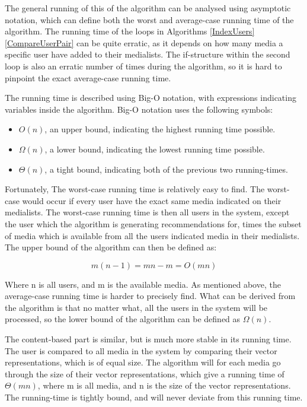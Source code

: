 The general running of this of the algorithm can be analysed using asymptotic notation, which can define both the worst and average-case running time of the algorithm. The running time of the loops in Algorithms \ref{IndexUsers} \ref{CompareUserPair} can be quite erratic, as it depends on how many media a specific user have added to their medialists. The if-structure within the second loop is also an erratic number of times during the algorithm, so it is hard to pinpoint the exact average-case running time.

The running time is described using Big-O notation, with expressions indicating variables inside the algorithm. Big-O notation uses the following symbols:
\begin{itemize}
	\item $O(n)$, an upper bound, indicating the highest running time possible.
	\item $\Omega(n)$, a lower bound, indicating the lowest running time possible.
	\item $\Theta(n)$, a tight bound, indicating both of the previous two running-times.
\end{itemize}

Fortunately, The worst-case running time is relatively easy to find. The worst-case would occur if every user have the exact same media indicated on their medialists. The worst-case running time is then all users in the system, except the user which the algorithm is generating recommendations for, times the subset of media which is available from all the users indicated media in their medialists. The upper bound of the algorithm can then be defined as:

\[
m(n-1) = mn - m = O(mn)
\]

Where n is all users, and m is the available media. As mentioned above, the average-case running time is harder to precisely find. What can be derived from the algorithm is that no matter what, all the users in the system will be processed, so the lower bound of the algorithm can be defined as $\Omega(n)$.

The content-based part is similar, but is much more stable in its running time. The user is compared to all media in the system by comparing their vector representations, which is of equal size. The algorithm will for each media go through the size of their vector representations, which give a running time of $\Theta(mn)$, where m is all media, and n is the size of the vector representations. The running-time is tightly bound, and will never deviate from this running time.